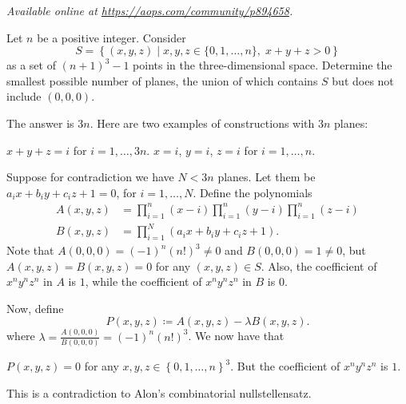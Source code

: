 
\textsl{Available online at \url{https://aops.com/community/p894658}.}
\begin{mdframed}[style=mdpurplebox,frametitle={Problem statement}]
Let $n$ be a positive integer.
Consider
\[ S = \left\{ (x,y,z) \mid
  x,y,z \in \{ 0, 1, \dots, n\}, \;
  x+y+z > 0 \right\} \]
as a set of $(n+1)^3-1$ points in the three-dimensional space.
Determine the smallest possible number of planes,
the union of which contains $S$ but does not include $(0,0,0)$.
\end{mdframed}
The answer is $3n$.
Here are two examples of constructions with $3n$ planes:
\begin{itemize}
  \ii $x+y+z=i$ for $i=1,\dots,3n$.
  \ii $x=i$, $y=i$, $z=i$ for $i=1,\dots,n$.
\end{itemize}
Suppose for contradiction we have $N < 3n$ planes.
Let them be $a_i x + b_i y + c_i z + 1 = 0$, for $i = 1, \dots, N$.
Define the polynomials
\begin{align*}
  A(x,y,z) &= \prod_{i=1}^n (x-i) \prod_{i=1}^n (y-i) \prod_{i=1}^n (z-i) \\
  B(x,y,z) &= \prod_{i=1}^N \left( a_i x + b_i y + c_i z + 1 \right).
\end{align*}
Note that $A(0,0,0) = (-1)^n  (n!)^3 \neq 0$
and $B(0,0,0) =  1 \neq 0$,
but $A(x,y,z) = B(x,y,z) = 0$ for any $(x,y,z) \in S$.
Also, the coefficient of $x^n y^n z^n$ in $A$ is $1$,
while the coefficient of $x^n y^n z^n$ in $B$ is $0$.

Now, define
\[ P(x,y,z) \coloneqq A(x,y,z) - \lambda  B(x,y,z). \]
where $\lambda = \frac{A(0,0,0)}{B(0,0,0)} = (-1)^{n} (n!)^3$.
We now have that
\begin{itemize}
  \ii $P(x,y,z) = 0$ for any $x,y,z \in \left\{ 0,1,\dots,n \right\}^3$.
  \ii But the coefficient of $x^n y^n z^n$ is $1$.
\end{itemize}
This is a contradiction to Alon's combinatorial nullstellensatz.
\pagebreak



